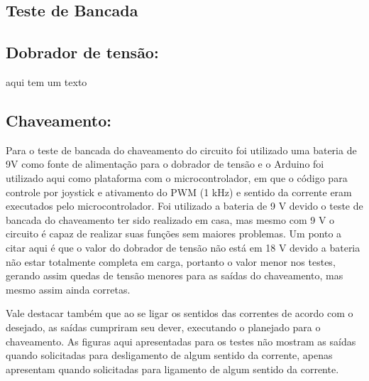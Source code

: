 \begin{anexosenv}

  \partanexos

  \chapter{Teste de Bancada}

      \section{Dobrador de tensão:}

      aqui tem um texto

      \section{Chaveamento:}

      Para o teste de bancada do chaveamento do circuito foi utilizado uma bateria de 9V como fonte de alimentação para o dobrador de tensão e o Arduino foi utilizado aqui como plataforma com o microcontrolador, em que o código para controle por joystick e ativamento do PWM (1 kHz) e sentido da corrente eram executados pelo microcontrolador. Foi utilizado a bateria de 9 V devido o teste de bancada do chaveamento ter sido realizado em casa, mas mesmo com 9 V o circuito é capaz de realizar suas funções sem maiores problemas. Um ponto a citar aqui é que o valor do dobrador de tensão não está em 18 V devido a bateria não estar totalmente completa em carga, portanto o valor menor nos testes, gerando assim quedas de tensão menores para as saídas do chaveamento, mas mesmo assim ainda corretas.

      Vale destacar também que ao se ligar os sentidos das correntes de acordo com o desejado, as saídas cumpriram seu dever, executando o planejado para o chaveamento. As figuras aqui apresentadas para os testes não mostram as saídas  quando solicitadas para desligamento de algum sentido da corrente, apenas apresentam quando solicitadas para ligamento de algum sentido da corrente.


\end{anexosenv}

